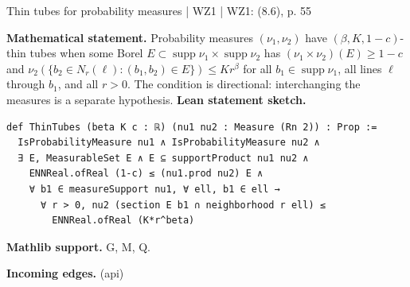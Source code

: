 \documentclass[10pt,a4paper]{article}
\newcommand{\nodecard}[1]{\hyperlink{node-#1}{\texttt{\detokenize{#1}}}}
\begin{document}
\begin{minipage}{\linewidth}
\hypertarget{node-Dthin}{}
\begin{tcolorbox}[colback=white,colframe=radialfg,colbacktitle=radialbg,coltitle=ink,boxrule=0.45pt,arc=1.6mm,left=3mm,right=3mm,top=2mm,bottom=2mm,title={\sffamily\bfseries WZ1 Definition 8.5 \hfill \texttt{Dthin}}]
{\sffamily\small\color{muted}Thin tubes for probability measures | WZ1 | WZ1: (8.6), p. 55}\par
\textbf{Mathematical statement.} Probability measures $(\nu_1,\nu_2)$ have $(\beta,K,1-c)$-thin tubes when some Borel
$E\subset\operatorname{supp}\nu_1\times\operatorname{supp}\nu_2$ has $(\nu_1\times\nu_2)(E)\ge1-c$ and
$\nu_2(\{b_2\in N_r(\ell):(b_1,b_2)\in E\})\le Kr^\beta$
for all $b_1\in\operatorname{supp}\nu_1$, all lines $\ell$ through $b_1$, and all $r>0$.
The condition is directional: interchanging the measures is a separate hypothesis.
\smallskip\textbf{Lean statement sketch.}
\begin{Verbatim}[fontsize=\small,breaklines=true,breakanywhere=true,tabsize=2]
def ThinTubes (beta K c : ℝ) (nu1 nu2 : Measure (Rn 2)) : Prop :=
  IsProbabilityMeasure nu1 ∧ IsProbabilityMeasure nu2 ∧
  ∃ E, MeasurableSet E ∧ E ⊆ supportProduct nu1 nu2 ∧
    ENNReal.ofReal (1-c) ≤ (nu1.prod nu2) E ∧
    ∀ b1 ∈ measureSupport nu1, ∀ ell, b1 ∈ ell →
      ∀ r > 0, nu2 (section E b1 ∩ neighborhood r ell) ≤
        ENNReal.ofReal (K*r^beta)
\end{Verbatim}
{\footnotesize\textbf{Mathlib support.} G, M, Q.\par
\textbf{Incoming edges.} \nodecard{Igeom} (api)\par}

\end{tcolorbox}\end{minipage}\par\medskip
\end{document}
